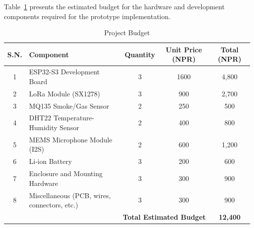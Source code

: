 

Table~\ref{tab:project-budget} presents the estimated budget for the hardware and
development components required for the prototype implementation.


\begin{table}[htbp]
  \centering
  \caption{Project Budget}
  \label{tab:project-budget}
  \vspace{1ex} %
  \begin{tabularx}{\textwidth}{@{} c >{\raggedright\arraybackslash}X c c c @{}}
    \toprule
    \textbf{S.N.} & \textbf{Component} & \textbf{Quantity} & \textbf{Unit Price (NPR)} & \textbf{Total (NPR)} \\
    \midrule
    1  & ESP32-S3 Development Board                  & 3 & 1600   & 4,800 \\
    2  & LoRa Module  (SX1278)                       & 3 & 900 & 2,700 \\
    3  & MQ135 Smoke/Gas Sensor                      & 2 & 250   & 500   \\
    4  & DHT22 Temperature-Humidity Sensor           & 2 & 400   & 800   \\
    5  & MEMS Microphone Module (I2S)                & 2 & 600   & 1,200 \\
    6  & Li-ion Battery                              & 3 & 200   & 600   \\
    7  & Enclosure and Mounting Hardware             & 3 & 300   & 900   \\
    8  & Miscellaneous (PCB, wires, connectors, etc.) & 3 & 300   & 900   \\
    \midrule
    \multicolumn{4}{r}{\textbf{Total Estimated Budget}} & \textbf{12,400} \\
    \bottomrule
  \end{tabularx}
\end{table}

\clearpage